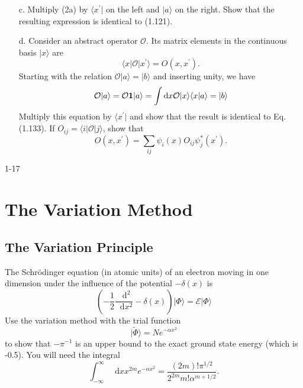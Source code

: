\documentclass[a4paper]{book}
\newcommand*{\dif}{\mathop{}\!\mathrm{d}}
\newcommand{\I}{{\bf 1}}
\begin{document}
\begin{exercise}
\begin{enumerate}
	\item[c.] Multiply (2a) by $\langle x^\prime |$ on the left and $| a \rangle$ on the right. Show that the resulting expression is identical to (1.121).
	
	\item[d.] Consider an abstract operator $\mathcal{O}$. Its matrix elements in the continuous basis $| x \rangle$ are
	\begin{equation*}
		\langle x | \mathcal{O} | x^\prime \rangle = O(x,x^\prime).
	\end{equation*}
	Starting with the relation $\mathcal{O}| a \rangle = | b \rangle$ and inserting unity, we have
	\begin{equation*}
		\mathcal{O} | a \rangle = \mathcal{O} \I | a \rangle = \int \dif x \mathcal{O} | x \rangle \langle x | a \rangle = | b \rangle
	\end{equation*}
	Multiply this equation by $\langle x^\prime |$ and show that the result is identical to Eq.(1.133).
	If $O_{ij} = \langle i | \mathcal{O} | j \rangle$, show that
	\begin{equation*}
		O(x,x^\prime) = \sum_{ij} \psi_i(x) O_{ij} \psi^*_j(x^\prime).
	\end{equation*}
	\end{enumerate}
	\end{exercise}
	
	\begin{solution}
		1-17
	\end{solution}
	
	\section{The Variation Method}
	
	\subsection{The Variation Principle}
	
	\begin{exercise}
	The Schr{\"o}dinger equation (in atomic units) of an electron moving in one dimension under the influence of the potential $-\delta(x)$ is
	\begin{equation*}
		\left(-\frac 12 \frac{\dif^2}{\dif x^2}-\delta(x)\right) | \Phi \rangle = \mathscr{E} | \Phi \rangle
	\end{equation*}
	Use the variation method with the trial function
	\begin{equation*}
		| \tilde{\Phi} \rangle = N e^{-\alpha x^2}
	\end{equation*}
	to show that $-\pi^{-1}$ is an upper bound to the exact ground state energy (which is -0.5). You will need the integral
	\begin{equation*}
		\int_{-\infty}^{\infty} \dif x x^{2m} e^{-\alpha x^2} = \frac{(2m)!\pi^{1/2}}{2^{2m}m!\alpha^{m+1/2}}.
	\end{equation*}
	\end{exercise}
	
\end{document}
